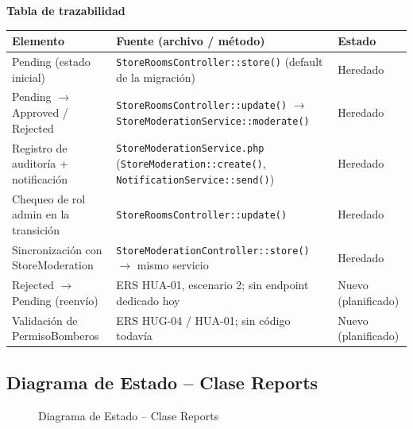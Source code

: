 \bigskip
\noindent\textbf{Tabla de trazabilidad}
\begin{longtable}{|L{4cm}|L{7.5cm}|M{2.3cm}|}
\hline
{} \textbf{Elemento} & \textbf{Fuente (archivo / método)} & \textbf{Estado} \\ \hline
\endhead
Pending (estado inicial) & \texttt{StoreRoomsController::store()} (default de la migración) & Heredado \\ \hline
Pending $\to$ Approved / Rejected & \texttt{StoreRoomsController::update()} $\to$ \texttt{StoreModerationService::moderate()} & Heredado \\ \hline
Registro de auditoría + notificación & \texttt{StoreModerationService.php} (\texttt{StoreModeration::create()}, \texttt{NotificationService::send()}) & Heredado \\ \hline
Chequeo de rol admin en la transición & \texttt{StoreRoomsController::update()} & Heredado \\ \hline
Sincronización con StoreModeration & \texttt{StoreModerationController::store()} $\to$ mismo servicio & Heredado \\ \hline
Rejected $\to$ Pending (reenvío) & ERS HUA-01, escenario 2; sin endpoint dedicado hoy & Nuevo (planificado) \\ \hline
Validación de PermisoBomberos & ERS HUG-04 / HUA-01; sin código todavía & Nuevo (planificado) \\ \hline
\end{longtable}
\clearpage

\subsection{Diagrama de Estado -- Clase Reports}
\begin{figure}[H]
    \centering
    \caption{Diagrama de Estado -- Clase Reports}
    \label{fig:estado03}
\end{figure}

